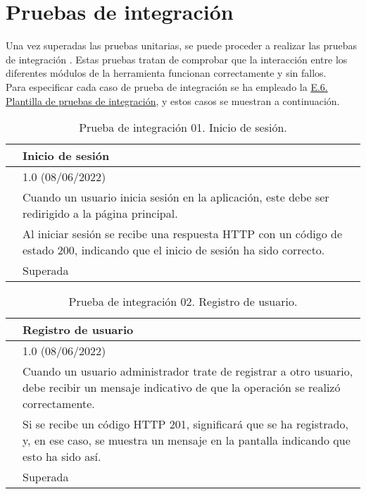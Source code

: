 \section{Pruebas de integración}

Una vez superadas las pruebas unitarias, se puede proceder a realizar las pruebas de integración \cite{pruebaintegracion}. Estas pruebas tratan de comprobar que la interacción entre los diferentes módulos de la herramienta funcionan correctamente y sin fallos. 
\\

Para especificar cada caso de prueba de integración se ha empleado la \hyperref[enlacePIX]{E.6. Plantilla de pruebas de integración}, y estos casos se muestran a continuación.

\begin{table}[H]
\begin{center}
\begin{tabular}{|p{3cm}|p{10cm}|} \hline
\centering {\bf PI-01} & Inicio de sesión  \\ \hline\hline
\centering {\bf Versión} & 1.0 (08/06/2022) \\ \hline
\centering {\bf Descripción} & Cuando un usuario inicia sesión en la aplicación, este debe ser redirigido a la página principal. \\ \hline
\centering {\bf Criterio de aceptación} & Al iniciar sesión se recibe una respuesta HTTP con un código de estado 200, indicando que el inicio de sesión ha sido correcto. \\ \hline
\centering {\bf Estado} & Superada \\ \hline
\end{tabular}
\caption{Prueba de integración 01. Inicio de sesión.}
\label{enlacePI1}
\end{center}
\end{table}

\begin{table}[H]
\begin{center}
\begin{tabular}{|p{3cm}|p{10cm}|} \hline
\centering {\bf PI-02} & Registro de usuario  \\ \hline\hline
\centering {\bf Versión} & 1.0 (08/06/2022) \\ \hline
\centering {\bf Descripción} & Cuando un usuario administrador trate de registrar a otro usuario, debe recibir un mensaje indicativo de que la operación se realizó correctamente. \\ \hline
\centering {\bf Criterio de aceptación} & Si se recibe un código HTTP 201, significará que se ha registrado, y, en ese caso, se muestra un mensaje en la pantalla indicando que esto ha sido así. \\ \hline
\centering {\bf Estado} & Superada \\ \hline
\end{tabular}
\caption{Prueba de integración 02. Registro de usuario.}
\label{enlacePI2}
\end{center}
\end{table}

